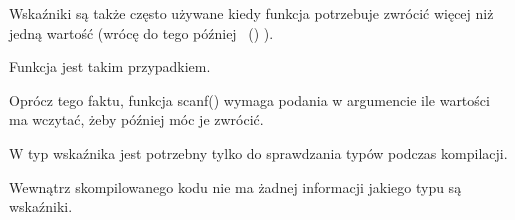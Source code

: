 Wskaźniki są także często używane kiedy funkcja potrzebuje zwrócić więcej niż jedną wartość (wrócę do tego później
~()
).

Funkcja  jest takim przypadkiem.

Oprócz tego faktu, funkcja scanf() wymaga podania w argumencie ile wartości ma wczytać, żeby później móc je zwrócić.

W \CCpp typ wskaźnika jest potrzebny tylko do sprawdzania typów podczas kompilacji.

Wewnątrz skompilowanego kodu nie ma żadnej informacji jakiego typu są wskaźniki.





